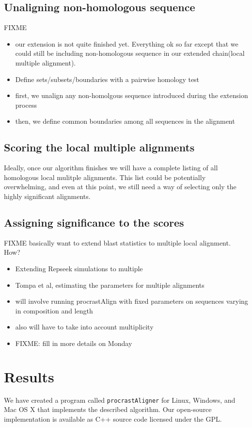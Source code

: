 \documentclass{llncs}
\begin{document}
\subsection{Unaligning non-homologous sequence}
FIXME
\begin{itemize}
\item our extension is not quite finished yet. Everything ok so far except that we could
still be including non-homologous sequence in our extended chain(local multiple alignment).
\item Define sets/subsets/boundaries with a pairwise homology test
\item first, we unalign any non-homolgous sequence introduced during the extension process
\item then, we define common boundaries among all sequences in the alignment
\end{itemize}
\subsection{Scoring the local multiple alignments}
Ideally, once our algorithm finishes we will have a complete listing of all homologous local mulitple alignments. This list could be potentially overwhelming, and even at this point, we still need a way of selecting only the highly significant alignments. 

\subsection{Assigning significance to the scores}
FIXME
basically want to extend blast statistics to multiple local alignment. How?
\begin{itemize}
\item Extending Repseek simulations to multiple
\item Tompa et al, estimating the parameters for multiple alignments
\item will involve running procrastAlign with fixed parameters on sequences varying in composition and length
\item also will have to take into account multiplicity
\item FIXME: fill in more details on Monday
\end{itemize}

\section{Results}
We have created a program called \texttt{procrastAligner} for Linux,
Windows, and Mac OS X that implements the described algorithm. Our
open-source implementation is available as C++ source code licensed
under the GPL.
\end{document}
